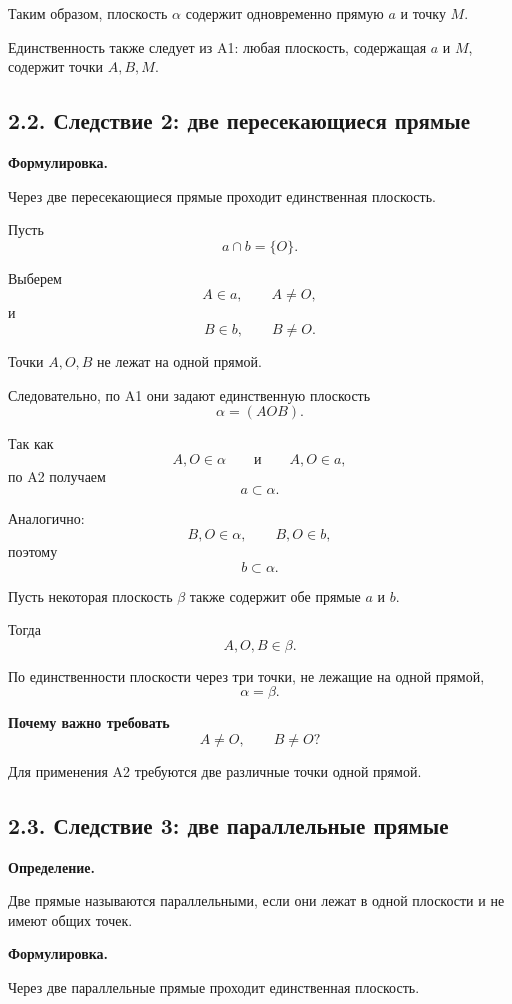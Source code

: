 \documentclass[a4paper,12pt]{article}
\newcommand{\term}[1]{\textbf{\textcolor{darkaccent}{#1}}}
\begin{document}
Таким образом, плоскость $\alpha$ содержит одновременно
прямую $a$ и точку $M$.

Единственность также следует из A1:
любая плоскость, содержащая $a$ и $M$,
содержит точки $A,B,M$.


\subsection*{2.2. Следствие 2: две пересекающиеся прямые}

\term{Формулировка.}

Через две пересекающиеся прямые проходит
единственная плоскость.

Пусть
\[
a\cap b=\{O\}.
\]

Выберем
\[
A\in a,
\qquad
A\ne O,
\]
и
\[
B\in b,
\qquad
B\ne O.
\]

Точки $A,O,B$ не лежат на одной прямой.

Следовательно, по A1 они задают единственную плоскость
\[
\alpha=(AOB).
\]

Так как
\[
A,O\in\alpha
\qquad\text{и}\qquad
A,O\in a,
\]
по A2 получаем
\[
a\subset\alpha.
\]

Аналогично:
\[
B,O\in\alpha,
\qquad
B,O\in b,
\]
поэтому
\[
b\subset\alpha.
\]

Пусть некоторая плоскость $\beta$ также содержит
обе прямые $a$ и $b$.

Тогда
\[
A,O,B\in\beta.
\]

По единственности плоскости через три точки,
не лежащие на одной прямой,
\[
\boxed{\alpha=\beta}.
\]

\textbf{Почему важно требовать}
\[
A\ne O,
\qquad
B\ne O?
\]

Для применения A2 требуются две различные точки одной прямой.


\subsection*{2.3. Следствие 3: две параллельные прямые}

\term{Определение.}

Две прямые называются параллельными,
если они лежат в одной плоскости
и не имеют общих точек.

\term{Формулировка.}

Через две параллельные прямые проходит
единственная плоскость.
\end{document}
